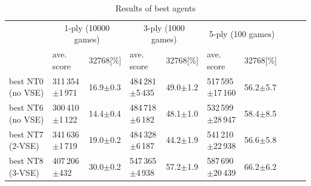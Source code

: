 \begin{table}
 \caption{Results of best agents}
 \label{table:exp3}
 \small\begin{tabular}{l|l|l|l|l|l|l|l|l|l}
  \hline \hline
  & \multicolumn{2}{c}{1-ply (10000 games)} & \multicolumn{2}{c}{3-ply (1000 games)} & \multicolumn{2}{c}{5-ply (100 games)} \\
  & ave. score & 32768[\%] & ave. score & 32768[\%] & ave. score & 32768[\%] \\
  \hline
   best NT0 (no VSE)	& 311\,354$\pm$1\,971		& 16.9$\pm$0.3	& 484\,281$\pm$5\,435	& 49.0$\pm$1.2	& 517\,595$\pm$17\,160	& 56.2$\pm$5.7 \\\hline
   best NT6 (no VSE)	& 300\,410$\pm$1\,122		& 14.4$\pm$0.4	& 484\,718$\pm$6\,182	& 48.1$\pm$1.0	& 532\,599$\pm$28\,947	& 58.4$\pm$8.5 \\\hline
   best NT7 (2-VSE)	& 341\,636$\pm$1\,719		& 19.0$\pm$0.2	& 484\,328$\pm$6\,187	& 44.2$\pm$1.9	& 541\,210$\pm$22\,938	& 56.6$\pm$5.8 \\\hline
   best NT8 (3-VSE)	& 407\,206$\pm$\phantom{1\,}432 & 30.0$\pm$0.2	& 547\,365$\pm$4\,938	& 57.2$\pm$1.9	& 587\,690$\pm$20\,439	& 66.2$\pm$6.2 \\\hline
 \end{tabular}
\end{table}
